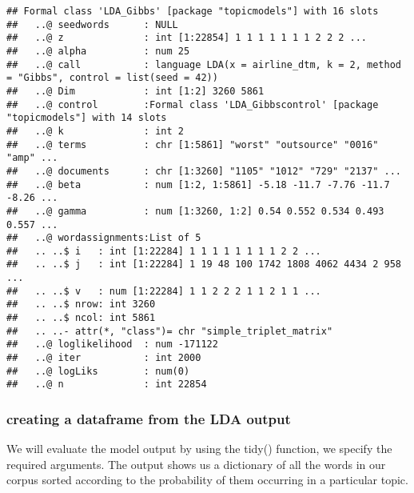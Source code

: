 \documentclass[
]{article}
\newenvironment{Shaded}{\begin{snugshade}}{\end{snugshade}}
\newcommand{\CommentTok}[1]{\textcolor[rgb]{0.56,0.35,0.01}{\textit{#1}}}
\newcommand{\DataTypeTok}[1]{\textcolor[rgb]{0.13,0.29,0.53}{#1}}
\newcommand{\KeywordTok}[1]{\textcolor[rgb]{0.13,0.29,0.53}{\textbf{#1}}}
\newcommand{\NormalTok}[1]{#1}
\newcommand{\OperatorTok}[1]{\textcolor[rgb]{0.81,0.36,0.00}{\textbf{#1}}}
\newcommand{\StringTok}[1]{\textcolor[rgb]{0.31,0.60,0.02}{#1}}
\begin{document}
\begin{verbatim}
## Formal class 'LDA_Gibbs' [package "topicmodels"] with 16 slots
##   ..@ seedwords      : NULL
##   ..@ z              : int [1:22854] 1 1 1 1 1 1 1 2 2 2 ...
##   ..@ alpha          : num 25
##   ..@ call           : language LDA(x = airline_dtm, k = 2, method = "Gibbs", control = list(seed = 42))
##   ..@ Dim            : int [1:2] 3260 5861
##   ..@ control        :Formal class 'LDA_Gibbscontrol' [package "topicmodels"] with 14 slots
##   ..@ k              : int 2
##   ..@ terms          : chr [1:5861] "worst" "outsource" "0016" "amp" ...
##   ..@ documents      : chr [1:3260] "1105" "1012" "729" "2137" ...
##   ..@ beta           : num [1:2, 1:5861] -5.18 -11.7 -7.76 -11.7 -8.26 ...
##   ..@ gamma          : num [1:3260, 1:2] 0.54 0.552 0.534 0.493 0.557 ...
##   ..@ wordassignments:List of 5
##   .. ..$ i   : int [1:22284] 1 1 1 1 1 1 1 1 2 2 ...
##   .. ..$ j   : int [1:22284] 1 19 48 100 1742 1808 4062 4434 2 958 ...
##   .. ..$ v   : num [1:22284] 1 1 2 2 2 1 1 2 1 1 ...
##   .. ..$ nrow: int 3260
##   .. ..$ ncol: int 5861
##   .. ..- attr(*, "class")= chr "simple_triplet_matrix"
##   ..@ loglikelihood  : num -171122
##   ..@ iter           : int 2000
##   ..@ logLiks        : num(0) 
##   ..@ n              : int 22854
\end{verbatim}

\hypertarget{creating-a-dataframe-from-the-lda-output}{%
\subsubsection{creating a dataframe from the LDA
output}\label{creating-a-dataframe-from-the-lda-output}}

We will evaluate the model output by using the tidy() function, we
specify the required arguments. The output shows us a dictionary of all
the words in our corpus sorted according to the probability of them
occurring in a particular topic.

\begin{Shaded}
\end{Shaded}
\end{document}
